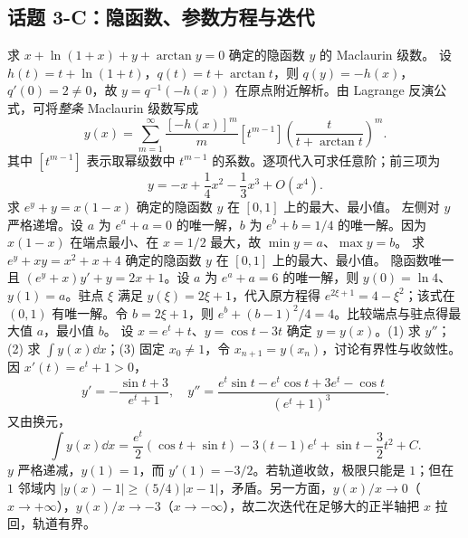 \subsection*{话题 3-C：隐函数、参数方程与迭代}
求 $x+\ln(1+x)+y+\arctan y=0$ 确定的隐函数 $y$ 的 Maclaurin 级数。
\sol 设 $h(t)=t+\ln(1+t)$，$q(t)=t+\arctan t$，则 $q(y)=-h(x)$，$q'(0)=2\ne0$，故 $y=q^{-1}(-h(x))$ 在原点附近解析。由 Lagrange 反演公式，可将\emph{整条} Maclaurin 级数写成
\[y(x)=\sum_{m=1}^{\infty}\frac{[-h(x)]^m}{m}[t^{m-1}]\left(\frac{t}{t+\arctan t}\right)^m.\]
其中 $[t^{m-1}]$ 表示取幂级数中 $t^{m-1}$ 的系数。逐项代入可求任意阶；前三项为
\[y=-x+\frac14x^2-\frac13x^3+O(x^4).\]
求 $e^y+y=x(1-x)$ 确定的隐函数 $y$ 在 $[0,1]$ 上的最大、最小值。
\sol 左侧对 $y$ 严格递增。设 $a$ 为 $e^a+a=0$ 的唯一解，$b$ 为 $e^b+b=1/4$ 的唯一解。因为 $x(1-x)$ 在端点最小、在 $x=1/2$ 最大，故 $\min y=a$、$\max y=b$。
求 $e^y+xy=x^2+x+4$ 确定的隐函数 $y$ 在 $[0,1]$ 上的最大、最小值。
\sol 隐函数唯一且 $(e^y+x)y'+y=2x+1$。设 $a$ 为 $e^a+a=6$ 的唯一解，则 $y(0)=\ln4$、$y(1)=a$。驻点 $\xi$ 满足 $y(\xi)=2\xi+1$，代入原方程得 $e^{2\xi+1}=4-\xi^2$；该式在 $(0,1)$ 有唯一解。令 $b=2\xi+1$，则 $e^b+(b-1)^2/4=4$。比较端点与驻点得最大值 $a$，最小值 $b$。
设 $x=e^t+t$、$y=\cos t-3t$ 确定 $y=y(x)$。(1) 求 $y''$；(2) 求 $\int y(x)\dd x$；(3) 固定 $x_0\ne1$，令 $x_{n+1}=y(x_n)$，讨论有界性与收敛性。
\sol 因 $x'(t)=e^t+1>0$，
\[y'=-\frac{\sin t+3}{e^t+1},\quad y''=\frac{e^t\sin t-e^t\cos t+3e^t-\cos t}{(e^t+1)^3}.\]
又由换元，
\[\int y(x)\dd x=\frac{e^t}{2}(\cos t+\sin t)-3(t-1)e^t+\sin t-\frac32t^2+C.\]
$y$ 严格递减，$y(1)=1$，而 $y'(1)=-3/2$。若轨道收敛，极限只能是 $1$；但在 $1$ 邻域内 $|y(x)-1|\ge(5/4)|x-1|$，矛盾。另一方面，$y(x)/x\to0$（$x\to+\infty$），$y(x)/x\to-3$（$x\to-\infty$），故二次迭代在足够大的正半轴把 $x$ 拉回，轨道有界。

